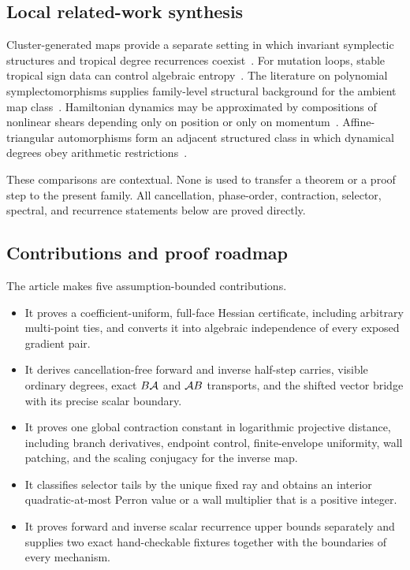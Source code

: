 \documentclass[11pt]{article}
\theoremstyle{definition}
\theoremstyle{remark}
\begin{document}
\subsection{Local related-work synthesis}

Cluster-generated maps provide a separate setting in which invariant
symplectic structures and tropical degree recurrences
coexist~\cite{FordyHone2011SymplecticMaps}.  For mutation loops, stable
tropical sign data can control algebraic
entropy~\cite{IshibashiKano2021AlgebraicEntropy}.  The literature on
polynomial symplectomorphisms supplies family-level structural background
for the ambient map class~\cite{JaneczkoJelonek2008PolynomialSymplectomorphisms}.
Hamiltonian dynamics may be approximated by compositions of nonlinear
shears depending only on position or only on
momentum~\cite{BergerTuraev2025GeneratorsHamiltonianMaps}.
Affine-triangular automorphisms form an adjacent structured class in which
dynamical degrees obey arithmetic
restrictions~\cite{BlancVanSanten2022DynamicalDegrees}.

These comparisons are contextual.  None is used to transfer a theorem or
a proof step to the present family.  All cancellation, phase-order,
contraction, selector, spectral, and recurrence statements below are
proved directly.

\subsection{Contributions and proof roadmap}

The article makes five assumption-bounded contributions.

\begin{itemize}
\item It proves a coefficient-uniform, full-face Hessian certificate,
including arbitrary multi-point ties, and converts it into algebraic
independence of every exposed gradient pair.
\item It derives cancellation-free forward and inverse half-step carries,
visible ordinary degrees, exact \(B\mathcal{A}\) and \(\mathcal{A} B\) transports, and
the shifted vector bridge with its precise scalar boundary.
\item It proves one global contraction constant in logarithmic projective
distance, including branch derivatives, endpoint control, finite-envelope
uniformity, wall patching, and the scaling conjugacy for the inverse map.
\item It classifies selector tails by the unique fixed ray and obtains an
interior quadratic-at-most Perron value or a wall multiplier that is a
positive integer.
\item It proves forward and inverse scalar recurrence upper bounds
separately and supplies two exact hand-checkable fixtures together with
the boundaries of every mechanism.
\end{itemize}
\end{document}
